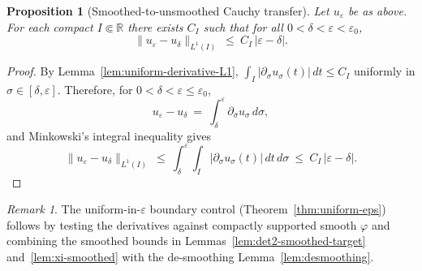 \documentclass[11pt]{article}
\newtheorem{proposition}[theorem]{Proposition}
\theoremstyle{definition}
\theoremstyle{remark}
\newtheorem{remark}[theorem]{Remark}
\newcommand{\R}{\mathbb{R}}
\begin{document}
\begin{proposition}[Smoothed-to-unsmoothed Cauchy transfer]\label{prop:desmoothing}
Let \(u_\varepsilon\) be as above. For each compact \(I\Subset\R\) there exists \(C_I\) such that for all \(0<\delta<\varepsilon<\varepsilon_0\),
\[
 \|u_\varepsilon-u_\delta\|_{L^1(I)}\ \le\ C_I\,|\varepsilon-\delta|.
\]
\end{proposition}
\begin{proof}
By Lemma~\ref{lem:uniform-derivative-L1}, \(\int_I |\partial_\sigma u_\sigma(t)|\,dt\le C_I\) uniformly in \(\sigma\in[\delta,\varepsilon]\). Therefore, for \(0<\delta<\varepsilon\le\varepsilon_0\),
\[
 u_\varepsilon-u_\delta\ =\ \int_\delta^\varepsilon \partial_\sigma u_\sigma\,d\sigma,
\]
and Minkowski's integral inequality gives
\[
 \|u_\varepsilon-u_\delta\|_{L^1(I)}\ \le\ \int_\delta^\varepsilon\!\int_I |\partial_\sigma u_\sigma(t)|\,dt\,d\sigma\ \le\ C_I\,|\varepsilon-\delta|.
\]
\end{proof}

\begin{remark}
The uniform-in-\(\varepsilon\) boundary control (Theorem~\ref{thm:uniform-eps}) follows by testing the derivatives against compactly supported smooth \(\varphi\) and combining the smoothed bounds in Lemmas~\ref{lem:det2-smoothed-target} and~\ref{lem:xi-smoothed} with the de-smoothing Lemma~\ref{lem:desmoothing}.
\end{remark}
\end{document}
